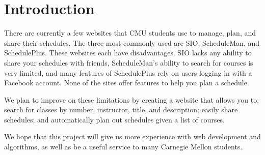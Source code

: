 \section{Introduction}
\setcounter{page}{1}  %
There are currently a few websites that CMU students use to manage, plan, and
share their schedules. The three most commonly used are SIO, ScheduleMan, and
SchedulePlus. These websites each have disadvantages. SIO lacks any ability to
share your schedules with friends, ScheduleMan's ability to search for courses
is very limited, and many features of SchedulePlus rely on users logging in with
a Facebook account.  None of the sites offer features to help you plan
a schedule.

We plan to improve on these limitations by creating a website that allows you
to: search for classes by number, instructor, title, and description; easily
share schedules; and automatically plan out schedules given a list of courses.

We hope that this project will give us more experience with web development and algorithms,
as well as be a useful service to many Carnegie Mellon students.
